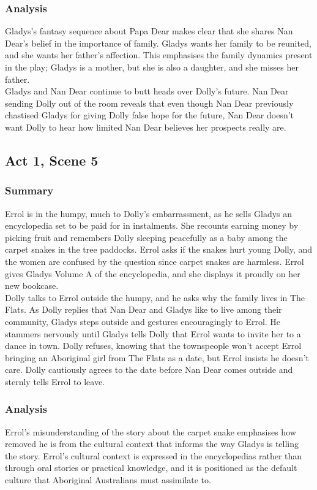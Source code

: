 \documentclass[a4paper]{article}
\begin{document}
\subsubsection{Analysis}
Gladys’s fantasy sequence about Papa Dear makes clear that she
shares Nan Dear’s belief in the importance of family. Gladys wants
her family to be reunited, and she wants her father’s affection. This
emphasises the family dynamics present in the play; Gladys is a
mother, but she is also a daughter, and she misses her father.\\

Gladys and Nan Dear continue to butt heads over Dolly’s future.
Nan Dear sending Dolly out of the room reveals that even though
Nan Dear previously chastised Gladys for giving Dolly false hope for
the future, Nan Dear doesn’t want Dolly to hear how limited Nan
Dear believes her prospects really are.\\

\subsection{Act 1, Scene 5}
\subsubsection{Summary}
Errol is in the humpy, much to Dolly’s embarrassment, as he
sells Gladys an encyclopedia set to be paid for in instalments.
She recounts earning money by picking fruit and remembers
Dolly sleeping peacefully as a baby among the carpet snakes in
the tree paddocks. Errol asks if the snakes hurt young Dolly,
and the women are confused by the question since carpet
snakes are harmless. Errol gives Gladys Volume A of the
encyclopedia, and she displays it proudly on her new bookcase.\\

Dolly talks to Errol outside the humpy, and he asks why the
family lives in The Flats. As Dolly replies that Nan Dear and
Gladys like to live among their community, Gladys steps outside
and gestures encouragingly to Errol. He stammers nervously
until Gladys tells Dolly that Errol wants to invite her to a dance
in town. Dolly refuses, knowing that the townspeople won’t
accept Errol bringing an Aboriginal girl from The Flats as a
date, but Errol insists he doesn’t care. Dolly cautiously agrees
to the date before Nan Dear comes outside and sternly tells
Errol to leave.\\

\subsubsection{Analysis}
Errol’s misunderstanding of the story about the carpet snake
emphasises how removed he is from the cultural context that
informs the way Gladys is telling the story. Errol’s cultural context is
expressed in the encyclopedias rather than through oral stories or
practical knowledge, and it is positioned as the default culture that
Aboriginal Australians must assimilate to.\\
\end{document}
